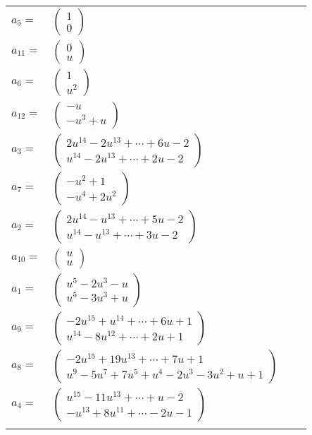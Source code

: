 \documentclass[1p]{elsarticle_modified}
\theoremstyle{definition}
\begin{document}
\begin{tabular}{m{7pt} m{180pt} m{7pt} m{180pt} }
\flushright $a_{5}=$&$\begin{pmatrix}1\\0\end{pmatrix}$ \\
\flushright $a_{11}=$&$\begin{pmatrix}0\\u\end{pmatrix}$ \\
\flushright $a_{6}=$&$\begin{pmatrix}1\\u^2\end{pmatrix}$ \\
\flushright $a_{12}=$&$\begin{pmatrix}- u\\- u^3+u\end{pmatrix}$ \\
\flushright $a_{3}=$&$\begin{pmatrix}2 u^{14}-2 u^{13}+\cdots+6 u-2\\u^{14}-2 u^{13}+\cdots+2 u-2\end{pmatrix}$ \\
\flushright $a_{7}=$&$\begin{pmatrix}- u^2+1\\- u^4+2 u^2\end{pmatrix}$ \\
\flushright $a_{2}=$&$\begin{pmatrix}2 u^{14}- u^{13}+\cdots+5 u-2\\u^{14}- u^{13}+\cdots+3 u-2\end{pmatrix}$ \\
\flushright $a_{10}=$&$\begin{pmatrix}u\\u\end{pmatrix}$ \\
\flushright $a_{1}=$&$\begin{pmatrix}u^5-2 u^3- u\\u^5-3 u^3+u\end{pmatrix}$ \\
\flushright $a_{9}=$&$\begin{pmatrix}-2 u^{15}+u^{14}+\cdots+6 u+1\\u^{14}-8 u^{12}+\cdots+2 u+1\end{pmatrix}$ \\
\flushright $a_{8}=$&$\begin{pmatrix}-2 u^{15}+19 u^{13}+\cdots+7 u+1\\u^9-5 u^7+7 u^5+u^4-2 u^3-3 u^2+u+1\end{pmatrix}$ \\
\flushright $a_{4}=$&$\begin{pmatrix}u^{15}-11 u^{13}+\cdots+u-2\\- u^{13}+8 u^{11}+\cdots-2 u-1\end{pmatrix}$\\&\end{tabular}
\end{document}
